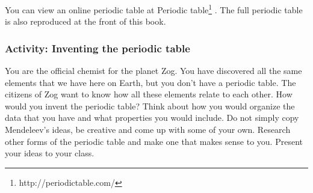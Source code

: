       \label{m38760*eip-773}You can view an online periodic table at Periodic table\footnote{http://periodictable.com/}
        . The full periodic table is also reproduced at the front of this book.\par \label{m38760*eip-400}
            \subsubsection{ Activity: Inventing the periodic table}
            \nopagebreak
            \label{m38760*eip-603}
You are the official chemist for the planet Zog. You have discovered all the same elements that we have here on Earth, but you don't have a periodic table. The citizens of Zog want to know how all these elements relate to each other. How would you invent the periodic table? Think about how you would organize the data that you have and what properties you would include. Do not simply copy Mendeleev's ideas, be creative and come up with some of your own. Research other forms of the periodic table and make one that makes sense to you. Present your ideas to your class. 
\par \label{m38760*uid134}
